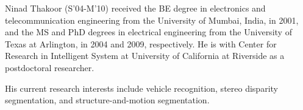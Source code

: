 \documentclass[10pt,journal]{IEEEtran}
\begin{document}
\begin{IEEEbiography}{Ninad Thakoor} 
(S'04-M'10) received the BE degree in electronics and telecommunication engineering from the University of Mumbai, India, in 2001, and the MS and PhD degrees in electrical engineering from the University of Texas at Arlington, in 2004 and 2009, respectively. He is with Center for Research in Intelligent System at University of California at Riverside as a postdoctoral researcher.

His current research interests include vehicle recognition, stereo disparity segmentation, and structure-and-motion segmentation.
\end{IEEEbiography}
\end{document}
